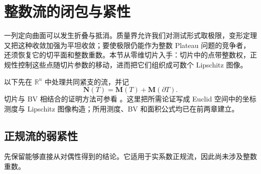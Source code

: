 
% 
% 
% 
% 
% 
% 
% 
% 
% 
% 
% 
% 
% 
% 
% 
% 

\section{整数流的闭包与紧性}
\label{g3:sec:2205}

一列定向曲面可以发生折叠与抵消。质量界允许我们对测试形式取极限，变形定理又把这种收敛加强为平坦收敛；要使极限仍能作为整数 Plateau 问题的竞争者，还须恢复它的切平面和整数重数。本节从零维切片入手：切片中的点带整数权，正规性控制这些点随切片参数的移动，进而把它们组织成可数个 Lipschitz 图像。

\ProseParagraphBreak
以下先在 \(\mathbb R^n\) 中处理共同紧支的流，并记
\[
	\mathbf N(T)=\mathbf M(T)+\mathbf M(\partial T).
\]
切片与 BV 相结合的证明方法可参看 \cite[第7节，引理7.3、定理7.4；第8节，定理8.1与8.5，第42--49页]{AmbrosioKirchheim2000Currents}。这里把所需论证写成 Euclid 空间中的坐标测度与 Lipschitz 图像构造；所用测度、BV 和面积公式均已在前两章建立。

\subsection{正规流的弱紧性}
\label{g3:subsec:2205:01}
先保留能够直接从对偶性得到的结论。它适用于实系数正规流，因此尚未涉及整数重数。

